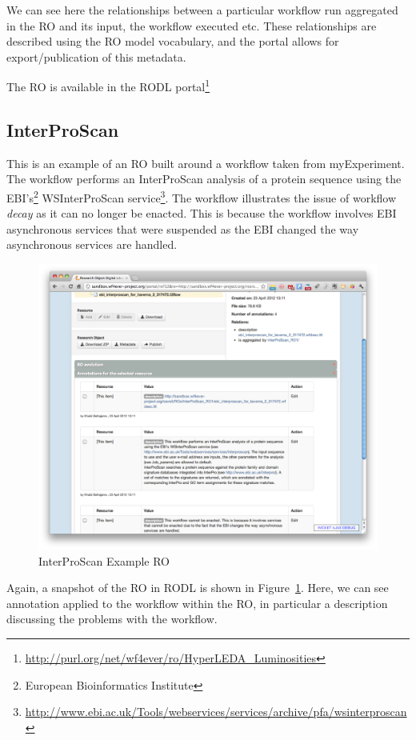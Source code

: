 We can see here the relationships between a particular workflow run
aggregated in the RO and its input, the workflow executed etc. These
relationships are described using the RO model vocabulary, and the
portal allows for export/publication of this metadata. 

The RO is available in the RODL
portal\footnote{\url{http://purl.org/net/wf4ever/ro/HyperLEDA_Luminosities}}

\subsection{InterProScan}

This is an example of an RO built around a workflow taken from
myExperiment. The workflow performs an InterProScan analysis of a
protein sequence using the EBI's\footnote{European Bioinformatics Institute} WSInterProScan service\footnote{\url{http://www.ebi.ac.uk/Tools/webservices/services/archive/pfa/wsinterproscan}}. The
workflow illustrates the issue of workflow \emph{decay} as it can no
longer be enacted. This is because the workflow involves EBI
asynchronous services that were suspended as the EBI changed the way
asynchronous services are handled. 

\begin{figure}[h]
  \centering
  \includegraphics[width=\picwidth]{Figures/interpro}
  \caption{InterProScan Example RO}
  \label{fig:interpro}
\end{figure}

Again, a snapshot of the RO in RODL is shown in
Figure~\ref{fig:interpro}. Here, we can see annotation applied to the
workflow within the RO, in particular a description discussing the
problems with the workflow. 

